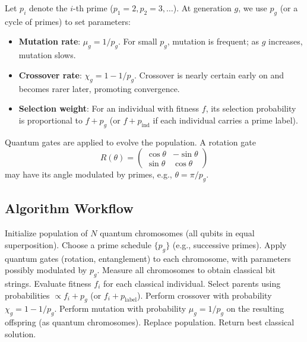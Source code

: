 \documentclass[12pt]{article}
\begin{document}
Let $p_i$ denote the $i$-th prime ($p_1=2,p_2=3,\dots$). At generation $g$, we use $p_g$ (or a cycle of primes) to set parameters:

\begin{itemize}
    \item \textbf{Mutation rate}: $\mu_g = 1/p_g$. For small $p_g$, mutation is frequent; as $g$ increases, mutation slows.
    \item \textbf{Crossover rate}: $\chi_g = 1 - 1/p_g$. Crossover is nearly certain early on and becomes rarer later, promoting convergence.
    \item \textbf{Selection weight}: For an individual with fitness $f$, its selection probability is proportional to $f + p_g$ (or $f + p_{\text{ind}}$ if each individual carries a prime label).
\end{itemize}

Quantum gates are applied to evolve the population. A rotation gate
\[
R(\theta) = \begin{pmatrix}\cos\theta & -\sin\theta \\ \sin\theta & \cos\theta\end{pmatrix}
\]
may have its angle modulated by primes, e.g., $\theta = \pi/p_g$.

\subsection{Algorithm Workflow}

\begin{algorithm}
\caption{Prime-Encoded Quantum Genetic Algorithm}
\begin{algorithmic}[1]
\State Initialize population of $N$ quantum chromosomes (all qubits in equal superposition).
\State Choose a prime schedule $\{p_g\}$ (e.g., successive primes).
    \State Apply quantum gates (rotation, entanglement) to each chromosome, with parameters possibly modulated by $p_g$.
    \State Measure all chromosomes to obtain classical bit strings.
    \State Evaluate fitness $f_i$ for each classical individual.
    \State Select parents using probabilities $\propto f_i + p_g$ (or $f_i + p_{\text{label}}$).
    \State Perform crossover with probability $\chi_g = 1 - 1/p_g$.
    \State Perform mutation with probability $\mu_g = 1/p_g$ on the resulting offspring (as quantum chromosomes).
    \State Replace population.
\EndFor
\State Return best classical solution.
\end{algorithmic}
\end{algorithm}
\end{document}
